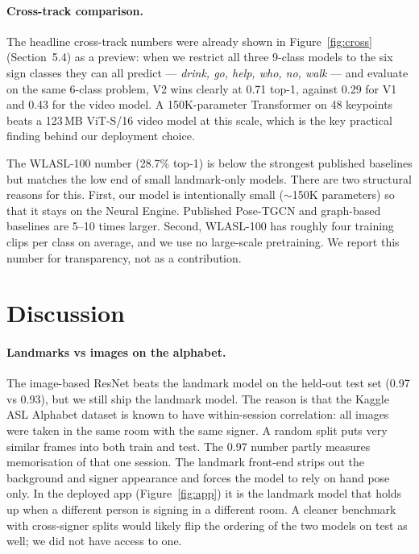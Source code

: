 \documentclass[11pt]{article}
\begin{document}
\paragraph{Cross-track comparison.} The headline cross-track numbers were already shown in Figure~\ref{fig:cross} (Section~5.4) as a preview: when we restrict all three 9-class models to the six sign classes they can all predict --- \textit{drink, go, help, who, no, walk} --- and evaluate on the same 6-class problem, V2 wins clearly at 0.71 top-1, against 0.29 for V1 and 0.43 for the video model. A 150K-parameter Transformer on 48 keypoints beats a 123\,MB ViT-S/16 video model at this scale, which is the key practical finding behind our deployment choice.

The WLASL-100 number (28.7\% top-1) is below the strongest published baselines but matches the low end of small landmark-only models. There are two structural reasons for this. First, our model is intentionally small ($\sim$150K parameters) so that it stays on the Neural Engine. Published Pose-TGCN and graph-based baselines are 5--10 times larger. Second, WLASL-100 has roughly four training clips per class on average, and we use no large-scale pretraining. We report this number for transparency, not as a contribution.

\section{Discussion}

\paragraph{Landmarks vs images on the alphabet.} The image-based ResNet beats the landmark model on the held-out test set (0.97 vs 0.93), but we still ship the landmark model. The reason is that the Kaggle ASL Alphabet dataset is known to have within-session correlation: all images were taken in the same room with the same signer. A random split puts very similar frames into both train and test. The 0.97 number partly measures memorisation of that one session. The landmark front-end strips out the background and signer appearance and forces the model to rely on hand pose only. In the deployed app (Figure~\ref{fig:app}) it is the landmark model that holds up when a different person is signing in a different room. A cleaner benchmark with cross-signer splits would likely flip the ordering of the two models on test as well; we did not have access to one.
\end{document}
